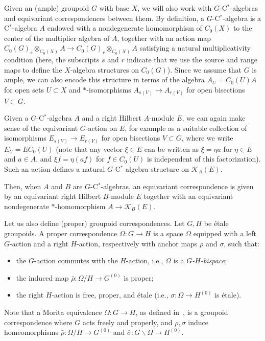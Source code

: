 \documentclass[a4paper,reqno]{amsart}
\theoremstyle{plain}
\theoremstyle{definition}
\theoremstyle{remark}
\numberwithin{equation}{section}
\newcommand{\cK}{\mathcal{K}}
\begin{document}
Given an (ample) groupoid $G$ with base $X$, we will also work with $G$-C$^*$-algebras and equivariant correspondences between them. By definition, a $G$-C$^*$-algebra is a C$^*$-algebra $A$ endowed with a nondegenerate homomorphism of $C_0(X)$ to the center of the multiplier algebra of $A$, together with an action map $C_0(G)_s \otimes_{C_0(X)} A \to C_0(G)_r \otimes_{C_0(X)} A$ satisfying a natural multiplicativity condition (here, the subscripts $s$ and $r$ indicate that we use the source and range maps to define the $X$-algebra structures on $C_0(G)$).
Since we assume that $G$ is ample, we can also encode this structure in terms of the algebra $A_U = C_0(U) A$ for open sets $U \subset X$ and $*$-isomorphisms $A_{s(V)} \to A_{r(V)}$ for open bisections $V \subset G$.

Given a $G$-C$^*$-algebra $A$ and a right Hilbert $A$-module $E$, we can again make sense of the equivariant $G$-action on $E$, for example as a suitable collection of isomorphisms $E_{s(V)} \to E_{r(V)}$ for open bisections $V \subset G$, where we write $E_U = E C_0(U)$ (note that any vector $\xi \in E$ can be written as $\xi = \eta a$ for $\eta \in E$ and $a \in A$, and $\xi f = \eta (a f)$ for $f \in C_0(U)$ is independent of this factorization).
Such an action defines a natural $G$-C$^*$-algebra structure on $\cK_A(E)$.

Then, when $A$ and $B$ are $G$-C$^*$-algebras, an equivariant correspondence is given by an equivariant right Hilbert $B$-module $E$ together with an equivariant nondegenerate $*$-homomorphism $A \to \cK_B(E)$.

Let us also define (proper) groupoid correspondences. Let $G,H$ be étale groupoids. A proper correspondence $\Omega\colon G\to H$ is a space $\Omega$ equipped with a left $G$-action and a right $H$-action, respectively with anchor maps $\rho$ and $\sigma$, such that:
\begin{itemize}
\item the $G$-action commutes with the $H$-action, i.e., $\Omega$ is a \emph{$G$-$H$-bispace};
\item the induced map $\bar{\rho}\colon \Omega/H\to G^{(0)}$ is proper;
\item the right $H$-action is free, proper, and étale (i.e., $\sigma\colon \Omega\to H^{(0)}$ is étale).
\end{itemize}
Note that a Morita equivalence $\Omega\colon G \to H$, as defined in~\cite{murewi:morita}, is a groupoid correspondence where $G$ acts freely and properly, and $\rho, \sigma$ induce homeomorphisms $\bar{\rho}\colon \Omega/H\to G^{(0)}$ and $\bar{\sigma}\colon G\backslash\Omega\to H^{(0)}$.
 
\end{document}
